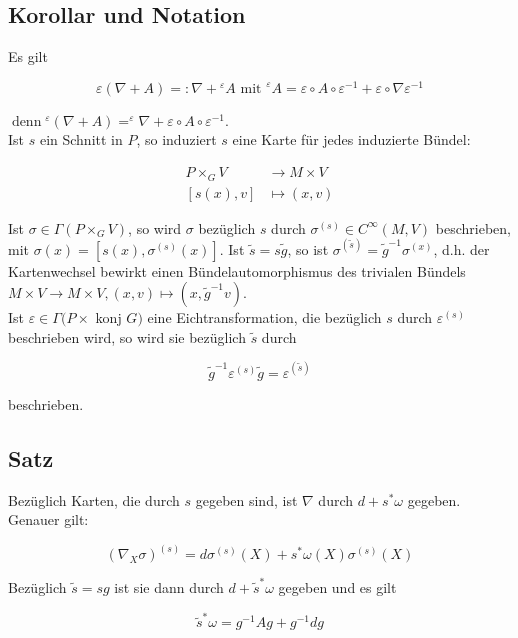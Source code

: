 \documentclass[10pt, letterpaper]{article}
\begin{document}
\subsection*{Korollar und Notation}
Es gilt

$$
\varepsilon(\nabla+A)=: \nabla+{ }^{\varepsilon} A \text { mit }^{\varepsilon} A=\varepsilon \circ A \circ \varepsilon^{-1}+\varepsilon \circ \nabla \varepsilon^{-1}
$$

$\operatorname{denn}{ }^{\varepsilon}(\nabla+A)=^{\varepsilon} \nabla+\varepsilon \circ A \circ \varepsilon^{-1}$.\\
Ist $s$ ein Schnitt in $P$, so induziert $s$ eine Karte für jedes induzierte Bündel:

$$
\begin{aligned}
P \times_{G} V & \rightarrow M \times V \\
{[s(x), v] } & \mapsto(x, v)
\end{aligned}
$$

Ist $\sigma \in \Gamma\left(P \times_{G} V\right)$, so wird $\sigma$ bezüglich $s$ durch $\sigma^{(s)} \in C^{\infty}(M, V)$ beschrieben, mit $\sigma(x)=\left[s(x), \sigma^{(s)}(x)\right]$. Ist $\tilde{s}=s \tilde{g}$, so ist $\sigma^{(\tilde{s})}=\tilde{g}^{-1} \sigma^{(x)}$, d.h. der Kartenwechsel bewirkt einen Bündelautomorphismus des trivialen Bündels $M \times V \rightarrow M \times V,(x, v) \mapsto\left(x, \tilde{g}^{-1} v\right)$.\\
Ist $\varepsilon \in \Gamma(P \times$ konj $G)$ eine Eichtransformation, die bezüglich $s$ durch $\varepsilon^{(s)}$ beschrieben wird, so wird sie bezüglich $\tilde{s}$ durch

$$
\tilde{g}^{-1} \varepsilon^{(s)} \tilde{g}=\varepsilon^{(\tilde{s})}
$$

beschrieben.

\subsection*{Satz}
Bezüglich Karten, die durch $s$ gegeben sind, ist $\nabla$ durch $d+s^{*} \omega$ gegeben.\\
Genauer gilt:

$$
\left(\nabla_{X} \sigma\right)^{(s)}=d \sigma^{(s)}(X)+s^{*} \omega(X) \sigma^{(s)}(X)
$$

Bezüglich $\tilde{s}=s g$ ist sie dann durch $d+\tilde{s}^{*} \omega$ gegeben und es gilt

$$
\tilde{s}^{*} \omega=g^{-1} A g+g^{-1} d g
$$
\end{document}
